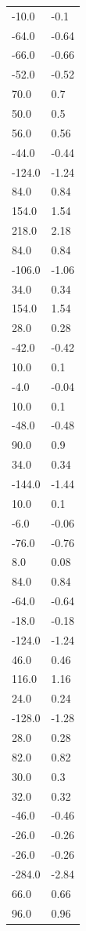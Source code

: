 \begin{longtable}{ll}
-10.0 & -0.1 \\
-64.0 & -0.64 \\
-66.0 & -0.66 \\
-52.0 & -0.52 \\
70.0 & 0.7 \\
50.0 & 0.5 \\
56.0 & 0.56 \\
-44.0 & -0.44 \\
-124.0 & -1.24 \\
84.0 & 0.84 \\
154.0 & 1.54 \\
218.0 & 2.18 \\
84.0 & 0.84 \\
-106.0 & -1.06 \\
34.0 & 0.34 \\
154.0 & 1.54 \\
28.0 & 0.28 \\
-42.0 & -0.42 \\
10.0 & 0.1 \\
-4.0 & -0.04 \\
10.0 & 0.1 \\
-48.0 & -0.48 \\
90.0 & 0.9 \\
34.0 & 0.34 \\
-144.0 & -1.44 \\
10.0 & 0.1 \\
-6.0 & -0.06 \\
-76.0 & -0.76 \\
8.0 & 0.08 \\
84.0 & 0.84 \\
-64.0 & -0.64 \\
-18.0 & -0.18 \\
-124.0 & -1.24 \\
46.0 & 0.46 \\
116.0 & 1.16 \\
24.0 & 0.24 \\
-128.0 & -1.28 \\
28.0 & 0.28 \\
82.0 & 0.82 \\
30.0 & 0.3 \\
32.0 & 0.32 \\
-46.0 & -0.46 \\
-26.0 & -0.26 \\
-26.0 & -0.26 \\
-284.0 & -2.84 \\
66.0 & 0.66 \\
96.0 & 0.96 \\

\end{longtable}
